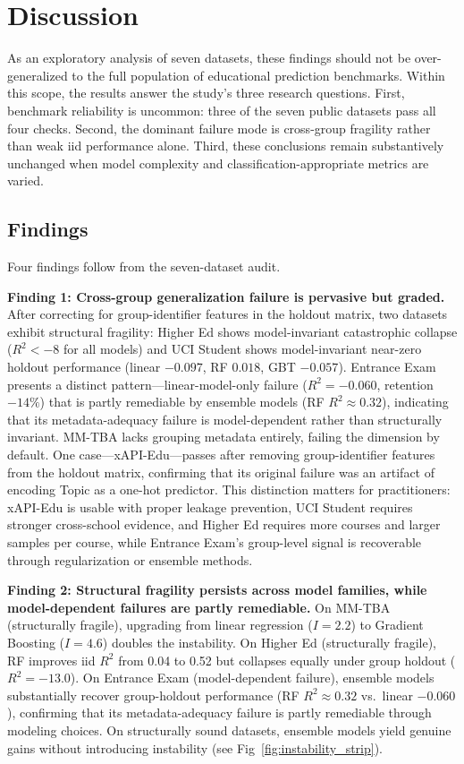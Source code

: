 \documentclass[10pt,letterpaper]{wlscirep}
\begin{document}
\FloatBarrier
\section{Discussion}

As an exploratory analysis of seven datasets, these findings should not be over-generalized to the full population of educational prediction benchmarks. Within this scope, the results answer the study's three research questions. First, benchmark reliability is uncommon: three of the seven public datasets pass all four checks. Second, the dominant failure mode is cross-group fragility rather than weak iid performance alone. Third, these conclusions remain substantively unchanged when model complexity and classification-appropriate metrics are varied.

\subsection{Findings}

Four findings follow from the seven-dataset audit.

\textbf{Finding 1: Cross-group generalization failure is pervasive but graded.} After correcting for group-identifier features in the holdout matrix, two datasets exhibit structural fragility: Higher Ed shows model-invariant catastrophic collapse ($R^2 < -8$ for all models) and UCI Student shows model-invariant near-zero holdout performance (linear $-0.097$, RF $0.018$, GBT $-0.057$). Entrance Exam presents a distinct pattern---linear-model-only failure ($R^2 = -0.060$, retention $-14\%$) that is partly remediable by ensemble models (RF $R^2 \approx 0.32$), indicating that its metadata-adequacy failure is model-dependent rather than structurally invariant. MM-TBA lacks grouping metadata entirely, failing the dimension by default. One case---xAPI-Edu---passes after removing group-identifier features from the holdout matrix, confirming that its original failure was an artifact of encoding Topic as a one-hot predictor. This distinction matters for practitioners: xAPI-Edu is usable with proper leakage prevention, UCI Student requires stronger cross-school evidence, and Higher Ed requires more courses and larger samples per course, while Entrance Exam's group-level signal is recoverable through regularization or ensemble methods.

\textbf{Finding 2: Structural fragility persists across model families, while model-dependent failures are partly remediable.} On MM-TBA (structurally fragile), upgrading from linear regression ($I = 2.2$) to Gradient Boosting ($I = 4.6$) doubles the instability. On Higher Ed (structurally fragile), RF improves iid $R^2$ from 0.04 to 0.52 but collapses equally under group holdout ($R^2 = -13.0$). On Entrance Exam (model-dependent failure), ensemble models substantially recover group-holdout performance (RF $R^2 \approx 0.32$ vs.\ linear $-0.060$), confirming that its metadata-adequacy failure is partly remediable through modeling choices. On structurally sound datasets, ensemble models yield genuine gains without introducing instability (see Fig~\ref{fig:instability_strip}).
\end{document}
